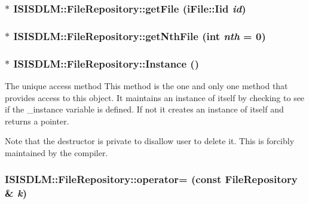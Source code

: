 \subsubsection{ $\ast$ ISISDLM::File\-Repository::get\-File ({\bf i\-File::Iid} {\em id})}\label{classISISDLM_1_1FileRepository_a3}


\subsubsection{ $\ast$ ISISDLM::File\-Repository::get\-Nth\-File (int {\em nth} = 0)}\label{classISISDLM_1_1FileRepository_a4}


\subsubsection{ $\ast$ ISISDLM::File\-Repository::Instance ()\hspace{0.3cm}{\tt  [static]}}\label{classISISDLM_1_1FileRepository_e0}


The unique access method This method is the one and only one method that provides access to this object. It maintains an instance of itself by checking to see if the \_\-instance variable is defined. If not it creates an instance of itself and returns a pointer.

Note that the destructor is private to disallow user to delete it. This is forcibly maintained by the compiler. 
\subsubsection{ ISISDLM::File\-Repository::operator= (const {\bf File\-Repository} \& {\em k})\hspace{0.3cm}{\tt  [private]}}\label{classISISDLM_1_1FileRepository_d2}



